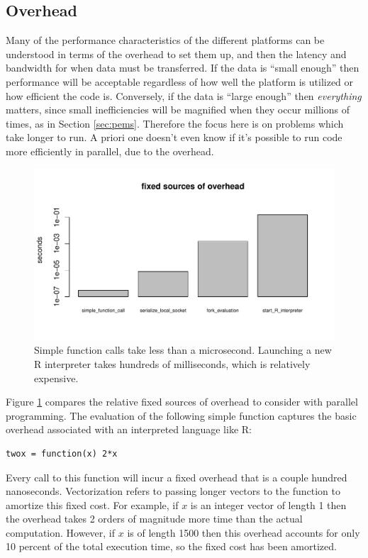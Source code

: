 \documentclass[12pt]{article}
\begin{document}
\subsection{Overhead}

Many of the performance characteristics of the different platforms can be
understood in terms of the overhead to set them up, and then the latency
and bandwidth for when data must be transferred.  If the data is ``small
enough'' then performance will be acceptable regardless of how well the
platform is utilized or how efficient the code is. Conversely, if the data
is ``large enough'' then \emph{everything} matters, since small
inefficiencies will be magnified when they occur millions of times, as in
Section \ref{sec:pems}.  Therefore the focus here is on problems which take longer
to run. A priori one doesn't even know if it's possible to run code more
efficiently in parallel, due to the overhead.

\begin{figure}
\centering
\includegraphics[width=.8\linewidth]{compute_times/overhead}
\caption{Simple function calls take less than a microsecond. Launching a
    new R interpreter takes hundreds of milliseconds, which is relatively expensive.}
\label{fig:overhead}
\end{figure}

Figure \ref{fig:overhead} compares the relative fixed sources of overhead to
consider with parallel programming. The evaluation of the following simple
function captures the basic overhead associated with an interpreted
language like R:
\begin{verbatim}
twox = function(x) 2*x
\end{verbatim}
Every call to this function will incur a fixed overhead that is a couple
hundred nanoseconds. Vectorization refers to passing longer vectors to the
function to amortize this fixed cost. For example, if $x$ is an integer
vector of length 1 then the overhead takes 2 orders of magnitude more time
than the actual computation. However, if $x$ is of length 1500 then this
overhead accounts for only 10 percent of the total execution time, so the
fixed cost has been amortized.
\end{document}
